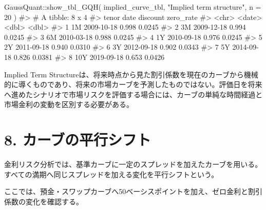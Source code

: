 \documentclass[
  letterpaper,
  DIV=11,
  numbers=noendperiod]{scrreprt}
\newenvironment{Shaded}{\begin{snugshade}}{\end{snugshade}}
\newcommand{\AttributeTok}[1]{\textcolor[rgb]{0.40,0.45,0.13}{#1}}
\newcommand{\CommentTok}[1]{\textcolor[rgb]{0.37,0.37,0.37}{#1}}
\newcommand{\DecValTok}[1]{\textcolor[rgb]{0.68,0.00,0.00}{#1}}
\newcommand{\FunctionTok}[1]{\textcolor[rgb]{0.28,0.35,0.67}{#1}}
\newcommand{\NormalTok}[1]{\textcolor[rgb]{0.00,0.23,0.31}{#1}}
\newcommand{\SpecialCharTok}[1]{\textcolor[rgb]{0.37,0.37,0.37}{#1}}
\newcommand{\StringTok}[1]{\textcolor[rgb]{0.13,0.47,0.30}{#1}}
\begin{document}
\begin{Shaded}
\begin{Highlighting}[]
\NormalTok{GaussQuant}\SpecialCharTok{::}\FunctionTok{show\_tbl\_GQH}\NormalTok{(}
\NormalTok{  implied\_curve\_tbl,}
  \StringTok{"Implied term structure"}\NormalTok{,}
  \AttributeTok{n =} \DecValTok{20}
\NormalTok{)}
\CommentTok{\#\textgreater{} \# A tibble: 8 x 4}
\CommentTok{\#\textgreater{}   tenor date       discount zero\_rate}
\CommentTok{\#\textgreater{}   \textless{}chr\textgreater{} \textless{}date\textgreater{}        \textless{}dbl\textgreater{}     \textless{}dbl\textgreater{}}
\CommentTok{\#\textgreater{} 1 1M    2009{-}10{-}18    0.998    0.0245}
\CommentTok{\#\textgreater{} 2 3M    2009{-}12{-}18    0.994    0.0245}
\CommentTok{\#\textgreater{} 3 6M    2010{-}03{-}18    0.988    0.0245}
\CommentTok{\#\textgreater{} 4 1Y    2010{-}09{-}18    0.976    0.0245}
\CommentTok{\#\textgreater{} 5 2Y    2011{-}09{-}18    0.940    0.0310}
\CommentTok{\#\textgreater{} 6 3Y    2012{-}09{-}18    0.902    0.0343}
\CommentTok{\#\textgreater{} 7 5Y    2014{-}09{-}18    0.826    0.0381}
\CommentTok{\#\textgreater{} 8 10Y   2019{-}09{-}18    0.653    0.0426}
\end{Highlighting}
\end{Shaded}

Implied Term
Structureは、将来時点から見た割引係数を現在のカーブから機械的に導くものであり、将来の市場カーブを予測したものではない。評価日を将来へ進めたシナリオで市場リスクを評価する場合には、カーブの単純な時間経過と市場金利の変動を区別する必要がある。

\section{8.
カーブの平行シフト}\label{ux30abux30fcux30d6ux306eux5e73ux884cux30b7ux30d5ux30c8}

金利リスク分析では、基準カーブに一定のスプレッドを加えたカーブを用いる。すべての満期へ同じスプレッドを加える変化を平行シフトという。

ここでは、預金・スワップカーブへ50ベーシスポイントを加え、ゼロ金利と割引係数の変化を確認する。
\end{document}
